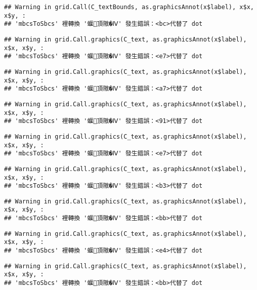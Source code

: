 \documentclass[
]{article}
\begin{document}
\begin{verbatim}
## Warning in grid.Call(C_textBounds, as.graphicsAnnot(x$label), x$x, x$y, :
## 'mbcsToSbcs' 裡轉換 '蝘頂隞�Ⅳ' 發生錯誤：<bc>代替了 dot
\end{verbatim}

\begin{verbatim}
## Warning in grid.Call.graphics(C_text, as.graphicsAnnot(x$label), x$x, x$y, :
## 'mbcsToSbcs' 裡轉換 '蝘頂隞�Ⅳ' 發生錯誤：<e7>代替了 dot
\end{verbatim}

\begin{verbatim}
## Warning in grid.Call.graphics(C_text, as.graphicsAnnot(x$label), x$x, x$y, :
## 'mbcsToSbcs' 裡轉換 '蝘頂隞�Ⅳ' 發生錯誤：<a7>代替了 dot
\end{verbatim}

\begin{verbatim}
## Warning in grid.Call.graphics(C_text, as.graphicsAnnot(x$label), x$x, x$y, :
## 'mbcsToSbcs' 裡轉換 '蝘頂隞�Ⅳ' 發生錯誤：<91>代替了 dot
\end{verbatim}

\begin{verbatim}
## Warning in grid.Call.graphics(C_text, as.graphicsAnnot(x$label), x$x, x$y, :
## 'mbcsToSbcs' 裡轉換 '蝘頂隞�Ⅳ' 發生錯誤：<e7>代替了 dot
\end{verbatim}

\begin{verbatim}
## Warning in grid.Call.graphics(C_text, as.graphicsAnnot(x$label), x$x, x$y, :
## 'mbcsToSbcs' 裡轉換 '蝘頂隞�Ⅳ' 發生錯誤：<b3>代替了 dot
\end{verbatim}

\begin{verbatim}
## Warning in grid.Call.graphics(C_text, as.graphicsAnnot(x$label), x$x, x$y, :
## 'mbcsToSbcs' 裡轉換 '蝘頂隞�Ⅳ' 發生錯誤：<bb>代替了 dot
\end{verbatim}

\begin{verbatim}
## Warning in grid.Call.graphics(C_text, as.graphicsAnnot(x$label), x$x, x$y, :
## 'mbcsToSbcs' 裡轉換 '蝘頂隞�Ⅳ' 發生錯誤：<e4>代替了 dot
\end{verbatim}

\begin{verbatim}
## Warning in grid.Call.graphics(C_text, as.graphicsAnnot(x$label), x$x, x$y, :
## 'mbcsToSbcs' 裡轉換 '蝘頂隞�Ⅳ' 發生錯誤：<bb>代替了 dot
\end{verbatim}
\end{document}
